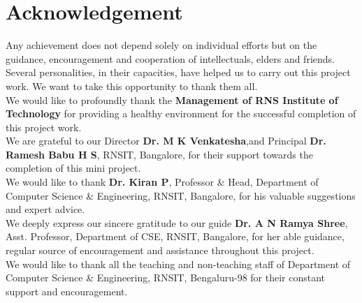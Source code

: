 \chapter*{Acknowledgement}%
%

Any achievement does not depend solely on individual 
efforts but on the guidance, encouragement and cooperation of intellectuals, elders and friends. Several personalities, in their capacities, have helped us to carry out this project work. We want to take this opportunity to thank them all.\\
We would like to profoundly thank the \textbf{ Management of RNS Institute of Technology }for providing a healthy environment for the successful completion of this project work.\\ 
We are grateful to our Director \textbf{ Dr. M K Venkatesha},and Principal \textbf{Dr. Ramesh Babu H S}, RNSIT, Bangalore, for their
support towards the completion of this mini project.\\
We would like to thank \textbf{Dr. Kiran P}, Professor \& Head, Department of Computer 
Science \& Engineering, RNSIT, Bangalore, for his valuable suggestions and expert advice.\\
We deeply express our sincere gratitude to our guide \textbf{Dr. A N Ramya Shree}, Asst. Professor, Department of CSE, RNSIT, Bangalore, for her able guidance, regular source of 
encouragement and assistance throughout this project. \\
We would like to thank all the teaching and non-teaching staff of Department of 
Computer Science \& Engineering, RNSIT, Bengaluru-98 for their constant support and encouragement.

\thispagestyle{plain}